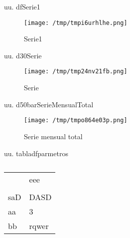 \documentclass[a4paper,10pt,twocolumn]{article}
\begin{document}
\begin{Form}
\begin{figure}[H]
                    \label{fig:dfassssdfsa}
                    \end{figure}
                    

uu. dfSerie1

\begin{figure}[H] \centering
                    
                    \texttt{[image: /tmp/tmpi6urhlhe.png]}
                    \caption{Serie1}
                    
                    \label{fig:dfassssdfsa}
                    \end{figure}
                    

uu. d30Serie

\begin{figure}[H] \centering
                    
                    \texttt{[image: /tmp/tmp24nv21fb.png]}
                    \caption{Serie}
                    
                    \label{fig:dfassssdfsa}
                    \end{figure}
                    

uu. d50barSerieMensualTotal

\begin{figure}[H] \centering
                    
                    \texttt{[image: /tmp/tmpo864e03p.png]}
                    \caption{Serie mensual total}
                    
                    \label{fig:dfassssdfsa}
                    \end{figure}
                    

uu. tabladfparmetros


                    \begin{table}[H] \centering
                        {
                        \begin{tabular}{ll}
\toprule
 & eee \\
 &  \\
\midrule
saD & DASD \\
aa & 3 \\
bb & rqwer \\
\bottomrule
\end{tabular}

                        }
                        \caption{}
                    \end{table}
                    


\end{Form}
\end{document}
